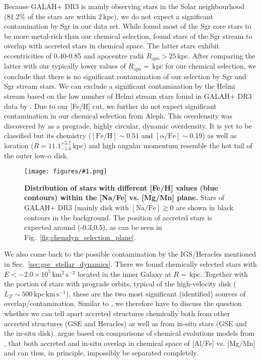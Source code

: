 \documentclass[fleqn,usenatbib]{mnras}
\newcommand{\kpc}{\,\mathrm{kpc}}	%
\newcommand{\kpckms}{\,\mathrm{kpc\,km\,s^{-1}}}	%
\newcommand{\kmkmss}{\,\mathrm{km^2\,s^{-2}}}	%
\newcommand{\codeicon}{{\faCloudDownload}}
\newcommand{\codelink}[1]{\href{https://github.com/svenbuder/buder_galah_accreted_chemistry/tree/main/figures/#1.ipynb}{\codeicon}\,\,}
\newcommand{\oscaption}[2]{\caption{#2 \codelink{#1}}}
\newcommand{\figurecolumnwidth}[3]{\begin{figure} \centering \texttt{[image: figures/\#1.png]}\oscaption{#2}{#3}\label{fig:#1} \end{figure}}
\begin{document}
Because GALAH+ DR3 is mainly observing stars in the Solar neighbourhood (81.2\% of the stars are within $2\kpc$), we do not expect a significant contamination by Sgr in our data set. While \citet{Hasselquist2017} found most of the Sgr core stars to be more metal-rich than our chemical selection, \citet{Hasselquist2019} found stars of the Sgr stream to overlap with accreted stars in chemical space. The latter stars exhibit eccentricities of 0.40-0.85 and apocentre radii $R_\text{apo} > 25\kpc$. After comparing the latter with our typically lower values of $R_\text{apo} = $$\kpc$ for our chemical selection, we conclude that there is no significant contamination of our selection by Sgr and Sgr stream stars. We can exclude a significant contamination by the Helmi stream based on the low number of Helmi stream stars found in GALAH+ DR3 data by \citet{Limberg2021}. Due to our [Fe/H] cut, we further do not expect significant contamination in our chemical selection from Aleph. This overdensity was discovered by \citet{Naidu2020} as a prograde, highly circular, dynamic overdensity. It is yet to be classified but its chemistry ($\mathrm{[Fe/H]} \sim 0.51$ and $\mathrm{[\alpha/Fe]} \sim 0.19$) as well as location ($R = 11.1_{-1.6}^{+5.7}\kpc$) and high angular momentum resemble the hot tail of the outer low-$\alpha$ disk.

\figurecolumnwidth{NaFe_MgMn_FeH_bins}{chronochemodynamic_comparison}{
\textbf{Distribution of stars with different [Fe/H] values (blue contours) within the [Na/Fe] vs. [Mg/Mn] plane.} Stars of GALAH+ DR3 (mainly disk with $\mathrm{[Na/Fe]} \gtrsim 0$ are shown in black contours in the background. The position of accreted stars is expected around (-0.3,0.5), as can be seen in Fig.~\ref{fig:chemdyn_selection_plane}.
}

We also come back to the possible contamination by the IGS/Heracles \citep{Horta2021} mentioned in Sec.~\ref{sec:gse_stellar_dynamics}. There we found  chemically selected stars with $E < -2.0 \times 10^5 \kmkmss$ located in the inner Galaxy at $R = $$ \kpc$. Together with the portion of  stars with prograde orbits, typical of the high-velocity disk ($L_Z \sim 500\kpckms$), these are the two most significant (identified) sources of overlap/contamination. Similar to \citet{Horta2021}, we therefore have to discuss the question whether we can tell apart accreted structures chemically both from other accreted structures (GSE and Heracles) as well as from in-situ stars (GSE and the in-situ disk). \citet{Horta2021} argue based on comparisons of chemical evolutions models from \citet{Andrews2017}, that both accreted and in-situ overlap in chemical space of [Al/Fe] vs. [Mg/Mn] and can thus, in principle, impossibly be separated completely.
\end{document}
